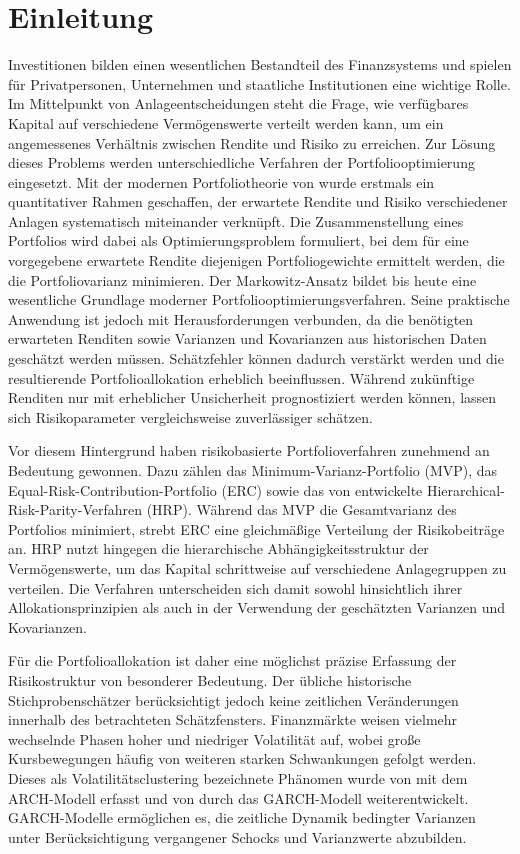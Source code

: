 \documentclass[a4paper, 12pt]{article}
\begin{document}
\section{Einleitung}\label{sec:einleitung}
Investitionen bilden einen wesentlichen Bestandteil des Finanzsystems und spielen für Privatpersonen, Unternehmen und staatliche Institutionen eine wichtige Rolle.
Im Mittelpunkt von Anlageentscheidungen steht die Frage, wie verfügbares Kapital auf verschiedene Vermögenswerte verteilt werden kann, um ein angemessenes Verhältnis zwischen Rendite und Risiko zu erreichen.
Zur Lösung dieses Problems werden unterschiedliche Verfahren der Portfoliooptimierung eingesetzt.
Mit der modernen Portfoliotheorie von \textcite{markowitz1952} wurde erstmals ein quantitativer Rahmen geschaffen, der erwartete Rendite und Risiko verschiedener Anlagen systematisch miteinander verknüpft.
Die Zusammenstellung eines Portfolios wird dabei als Optimierungsproblem formuliert, bei dem für eine vorgegebene erwartete Rendite diejenigen Portfoliogewichte ermittelt werden, die die Portfoliovarianz minimieren.
Der Markowitz-Ansatz bildet bis heute eine wesentliche Grundlage moderner Portfoliooptimierungsverfahren.
Seine praktische Anwendung ist jedoch mit Herausforderungen verbunden, da die benötigten erwarteten Renditen sowie Varianzen und Kovarianzen aus historischen Daten geschätzt werden müssen.
Schätzfehler können dadurch verstärkt werden und die resultierende Portfolioallokation erheblich beeinflussen.
Während zukünftige Renditen nur mit erheblicher Unsicherheit prognostiziert werden können, lassen sich Risikoparameter vergleichsweise zuverlässiger schätzen.

Vor diesem Hintergrund haben risikobasierte Portfolioverfahren zunehmend an Bedeutung gewonnen.
Dazu zählen das Minimum-Varianz-Portfolio (MVP), das Equal-Risk-Contribution-Portfolio (ERC) sowie das von \textcite{deprado2016} entwickelte Hierarchical-Risk-Parity-Verfahren (HRP).
Während das MVP die Gesamtvarianz des Portfolios minimiert, strebt ERC eine gleichmäßige Verteilung der Risikobeiträge an.
HRP nutzt hingegen die hierarchische Abhängigkeitsstruktur der Vermögenswerte, um das Kapital schrittweise auf verschiedene Anlagegruppen zu verteilen.
Die Verfahren unterscheiden sich damit sowohl hinsichtlich ihrer Allokationsprinzipien als auch in der Verwendung der geschätzten Varianzen und Kovarianzen.

Für die Portfolioallokation ist daher eine möglichst präzise Erfassung der Risikostruktur von besonderer Bedeutung.
Der übliche historische Stichprobenschätzer berücksichtigt jedoch keine zeitlichen Veränderungen innerhalb des betrachteten Schätzfensters.
Finanzmärkte weisen vielmehr wechselnde Phasen hoher und niedriger Volatilität auf, wobei große Kursbewegungen häufig von weiteren starken Schwankungen gefolgt werden.
Dieses als Volatilitätsclustering bezeichnete Phänomen wurde von \textcite{engle1982} mit dem ARCH-Modell erfasst und von \textcite{bollerslev1986} durch das GARCH-Modell weiterentwickelt.
GARCH-Modelle ermöglichen es, die zeitliche Dynamik bedingter Varianzen unter Berücksichtigung vergangener Schocks und Varianzwerte abzubilden.
\end{document}

